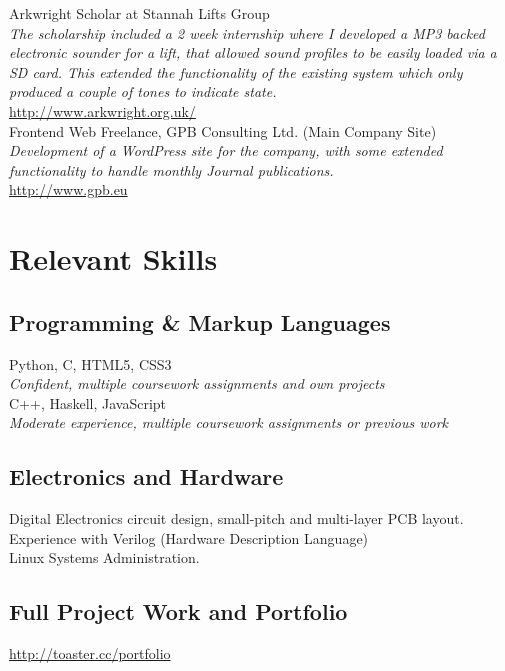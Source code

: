\documentclass[10pt, a4paper]{article}
\newcommand{\years}[1]{\marginnote{\scriptsize #1}}
\begin{document}
\years{2012} Arkwright Scholar at Stannah Lifts Group \\
\emph{The scholarship included a 2 week internship where I developed a MP3 backed electronic sounder for a lift, 
  that allowed sound profiles to be easily loaded via a SD card. This extended the functionality of the 
  existing system which only produced a couple of tones to indicate state.} \\
\href{http://www.arkwright.org.uk/}{http://www.arkwright.org.uk/}\\

\years{2011-2012} Frontend Web Freelance, GPB Consulting Ltd. (Main Company Site) \\
\emph{Development of a WordPress site for the company, with some extended functionality to handle 
  monthly Journal publications.}\\
\href{http://www.gpb.eu}{http://www.gpb.eu}

\section*{Relevant Skills}

\subsection*{Programming \& Markup Languages}

Python, C, HTML5, CSS3 \\
\emph{Confident, multiple coursework assignments and own projects}\\
C++, Haskell, JavaScript\\
\emph{Moderate experience, multiple coursework assignments or previous work}

\subsection*{Electronics and Hardware}

Digital Electronics circuit design, small-pitch and multi-layer PCB layout.\\
Experience with Verilog (Hardware Description Language)\\
Linux Systems Administration.

\subsection*{Full Project Work and Portfolio}

\href{http://toaster.cc/portfolio}{http://toaster.cc/portfolio}
\end{document}
